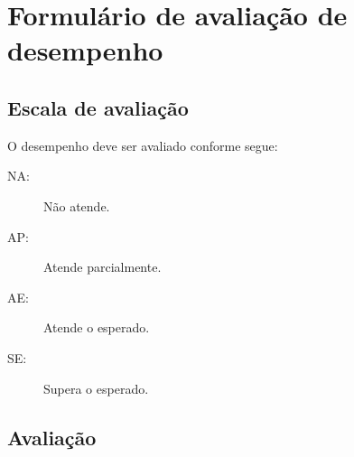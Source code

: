 \chapter{Formulário de avaliação de desempenho}
\label{ch:team-evaluation-form}

\section{Escala de avaliação}

O desempenho deve ser avaliado conforme segue:

\begin{description}
    \item[NA:] Não atende.
    \item[AP:] Atende parcialmente.
    \item[AE:] Atende o esperado.
    \item[SE:] Supera o esperado.
\end{description}

\section{Avaliação}

